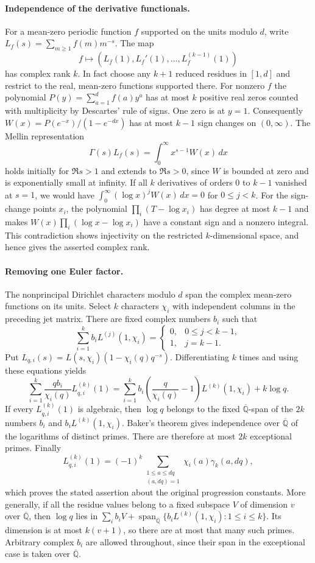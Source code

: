 \documentclass[11pt,a4paper,oneside,openany]{report}
\theoremstyle{remark}\newtheorem{remark}[theorem]{Remark}
\numberwithin{equation}{section}
\begin{document}
\paragraph{Independence of the derivative functionals.}
For a mean-zero periodic function $f$ supported on the units modulo $d$,
write $L_f(s)=\sum_{m\ge1}f(m)m^{-s}$. The map
\[
 f\longmapsto (L_f(1),L_f'(1),\ldots,L_f^{(k-1)}(1))
\]
has complex rank $k$. In fact choose any $k+1$ reduced residues in
$[1,d]$ and restrict to the real, mean-zero functions supported there.
For nonzero $f$ the polynomial $P(y)=\sum_{a=1}^d f(a)y^a$ has at most
$k$ positive real zeros counted with multiplicity by Descartes' rule
of signs. One zero is at $y=1$. Consequently
$W(x)=P(e^{-x})/(1-e^{-dx})$ has at most $k-1$ sign changes on
$(0,\infty)$. The Mellin representation
\[
 \Gamma(s)L_f(s)=\int_0^\infty x^{s-1}W(x)\,dx
\]
holds initially for $\Re s>1$ and extends to $\Re s>0$, since
$W$ is bounded at zero and is exponentially small at infinity.
If all $k$ derivatives of orders $0$ to $k-1$ vanished at $s=1$,
we would have $\int_0^\infty(\log x)^j W(x)\,dx=0$ for $0\le j<k$.
For the sign-change points $x_i$, the polynomial
$\prod_i(T-\log x_i)$ has degree at most $k-1$ and makes
$W(x)\prod_i(\log x-\log x_i)$ have a constant sign and a nonzero
integral. This contradiction shows injectivity on the restricted
$k$-dimensional space, and hence gives the asserted complex rank.

\paragraph{Removing one Euler factor.}
The nonprincipal Dirichlet characters modulo $d$ span the complex
mean-zero functions on its units. Select $k$ characters $\chi_i$ with
independent columns in the preceding jet matrix. There are fixed complex
numbers $b_i$ such that
\[
 \sum_{i=1}^k b_i L^{(j)}(1,\chi_i)
 =\begin{cases}0,&0\le j<k-1,\\1,&j=k-1.\end{cases}
\]
Put $L_{q,i}(s)=L(s,\chi_i)(1-\chi_i(q)q^{-s})$. Differentiating $k$
times and using these equations yields
\[
 \sum_{i=1}^k\frac{qb_i}{\chi_i(q)}L_{q,i}^{(k)}(1)
 =\sum_{i=1}^k b_i\left(\frac{q}{\chi_i(q)}-1\right)
      L^{(k)}(1,\chi_i)+k\log q .
\]
If every $L_{q,i}^{(k)}(1)$ is algebraic, then $\log q$ belongs to the
fixed $\overline{\mathbb Q}$-span of the $2k$ numbers
$b_i$ and $b_iL^{(k)}(1,\chi_i)$. Baker's theorem gives independence
over $\overline{\mathbb Q}$ of the logarithms of distinct primes. There
are therefore at most $2k$ exceptional primes. Finally
\[
 L_{q,i}^{(k)}(1)=(-1)^k
 \sum_{\substack{1\le a\le dq\\(a,dq)=1}}\chi_i(a)\gamma_k(a,dq),
\]
which proves the stated assertion about the original progression
constants. More generally, if all the residue values belong to a fixed subspace $V$ of dimension $v$ over $\overline{\mathbb Q}$, then $\log q$ lies in $\sum_i b_i V+\operatorname{span}_{\overline{\mathbb Q}}\{b_iL^{(k)}(1,\chi_i):1\le i\le k\}$. Its dimension is at most $k(v+1)$, so there are at most that many such primes. Arbitrary complex $b_i$ are allowed throughout, since
their span in the exceptional case is taken over $\overline{\mathbb Q}$.
\end{document}
